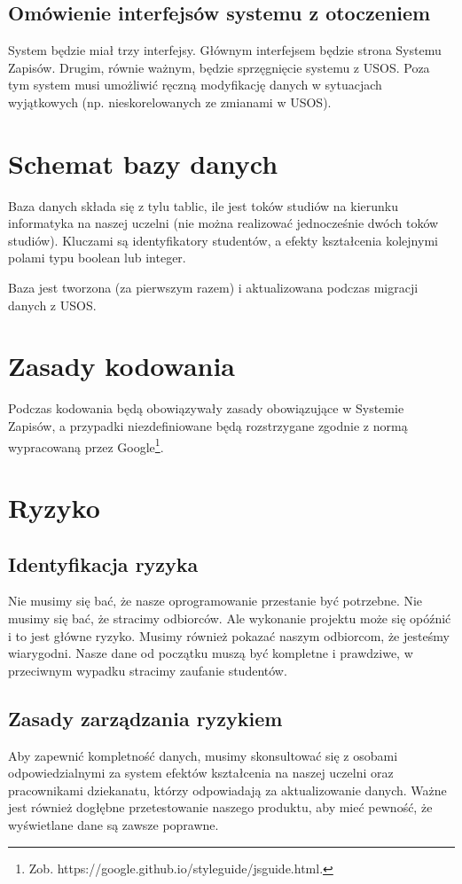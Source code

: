 \documentclass{article}
\begin{document}
\subsection{Omówienie interfejsów systemu z otoczeniem}
System będzie miał trzy interfejsy.
Głównym interfejsem będzie strona Systemu Zapisów.
Drugim, równie ważnym, będzie sprzęgnięcie systemu z USOS.
Poza tym system musi umożliwić ręczną modyfikację danych w sytuacjach wyjątkowych (np. nieskorelowanych ze zmianami w USOS).


\section{Schemat bazy danych}
Baza danych składa się z tylu tablic, ile jest toków studiów na kierunku informatyka na naszej uczelni (nie można realizować jednocześnie dwóch toków studiów).
Kluczami są identyfikatory studentów, a efekty kształcenia kolejnymi polami typu boolean lub integer.

Baza jest tworzona (za pierwszym razem) i aktualizowana podczas migracji danych z USOS.


\section{Zasady kodowania}
Podczas kodowania będą obowiązywały zasady obowiązujące w Systemie Zapisów, a przypadki niezdefiniowane będą rozstrzygane zgodnie z normą wypracowaną przez Google\footnote{Zob. https://google.github.io/styleguide/jsguide.html.}.


\section{Ryzyko}

\subsection{Identyfikacja ryzyka}
Nie musimy się bać, że nasze oprogramowanie przestanie być potrzebne. Nie musimy się bać, że stracimy odbiorców. Ale wykonanie projektu może się opóźnić i to jest główne ryzyko.
Musimy również pokazać naszym odbiorcom, że jesteśmy wiarygodni. Nasze dane od początku muszą być kompletne i prawdziwe, w przeciwnym wypadku stracimy zaufanie studentów.

\subsection{Zasady zarządzania ryzykiem}
Aby zapewnić kompletność danych, musimy skonsultować się z osobami odpowiedzialnymi za system efektów kształcenia na naszej uczelni oraz pracownikami dziekanatu, którzy odpowiadają za aktualizowanie danych.
Ważne jest również dogłębne przetestowanie naszego produktu, aby mieć pewność, że wyświetlane dane są zawsze poprawne.
\end{document}
